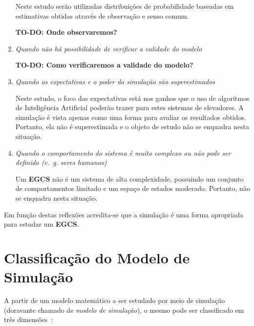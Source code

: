 \begin{enumerate}
Neste estudo serão utilizadas distribuições de probabilidade baseadas em
estimativas obtidas através de observação e senso comum.

\textbf{TO-DO: Onde observaremos?} %

\item \textit{Quando não há possibilidade de verificar a validade do modelo}

\textbf{TO-DO: Como verificaremos a validade do modelo?} %

\item \textit{Quando as expectativas e o poder da simulação são superestimados}

Neste estudo, o foco das expectativas está nos ganhos que o uso de algoritmos de
Inteligência Artificial poderão trazer para estes sistemas de elevadores. A
simulação é vista apenas como uma forma para avaliar os resultados obtidos.
Portanto, ela não é superestimada e o objeto de estudo não se enquadra nesta
situação.

\item \textit{Quando o comportamento do sistema é muito complexo ou não pode ser
definido (e.~g. seres humanos)}

Um \textbf{EGCS} não é um sistema de alta complexidade, possuindo um conjunto de
comportamentos limitado e um espaço de estados moderado. Portanto, não se
enquadra nesta situação.

\end{enumerate}

Em função destas reflexões acredita-se que a simulação é uma forma apropriada
para estudar um \textbf{EGCS}.

\section{Classificação do Modelo de Simulação}

A partir de um modelo matemático a ser estudado por meio de simulação (doravante
chamado de \textit{modelo de simulação}), o mesmo pode ser classificado em três
dimensões~\cite{Banks,Law}:

